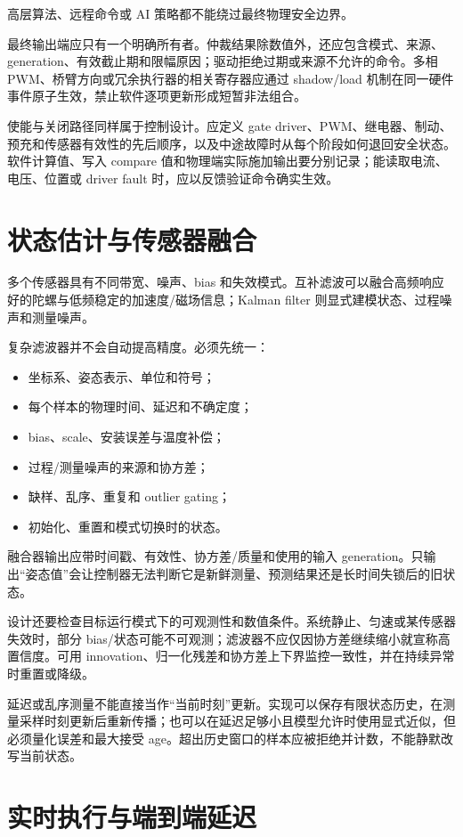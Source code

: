 高层算法、远程命令或 AI 策略都不能绕过最终物理安全边界。

最终输出端应只有一个明确所有者。仲裁结果除数值外，还应包含模式、来源、generation、有效截止期和限幅原因；驱动拒绝过期或来源不允许的命令。多相 PWM、桥臂方向或冗余执行器的相关寄存器应通过 shadow/load 机制在同一硬件事件原子生效，禁止软件逐项更新形成短暂非法组合。

使能与关闭路径同样属于控制设计。应定义 gate driver、PWM、继电器、制动、预充和传感器有效性的先后顺序，以及中途故障时从每个阶段如何退回安全状态。软件计算值、写入 compare 值和物理端实际施加输出要分别记录；能读取电流、电压、位置或 driver fault 时，应以反馈验证命令确实生效。

\section{状态估计与传感器融合}

多个传感器具有不同带宽、噪声、bias 和失效模式。互补滤波可以融合高频响应好的陀螺与低频稳定的加速度/磁场信息；Kalman filter 则显式建模状态、过程噪声和测量噪声。

复杂滤波器并不会自动提高精度。必须先统一：

\begin{itemize}
  \item 坐标系、姿态表示、单位和符号；
  \item 每个样本的物理时间、延迟和不确定度；
  \item bias、scale、安装误差与温度补偿；
  \item 过程/测量噪声的来源和协方差；
  \item 缺样、乱序、重复和 outlier gating；
  \item 初始化、重置和模式切换时的状态。
\end{itemize}

融合器输出应带时间戳、有效性、协方差/质量和使用的输入 generation。只输出“姿态值”会让控制器无法判断它是新鲜测量、预测结果还是长时间失锁后的旧状态。

设计还要检查目标运行模式下的可观测性和数值条件。系统静止、匀速或某传感器失效时，部分 bias/状态可能不可观测；滤波器不应仅因协方差继续缩小就宣称高置信度。可用 innovation、归一化残差和协方差上下界监控一致性，并在持续异常时重置或降级。

延迟或乱序测量不能直接当作“当前时刻”更新。实现可以保存有限状态历史，在测量采样时刻更新后重新传播；也可以在延迟足够小且模型允许时使用显式近似，但必须量化误差和最大接受 age。超出历史窗口的样本应被拒绝并计数，不能静默改写当前状态。

\section{实时执行与端到端延迟}

